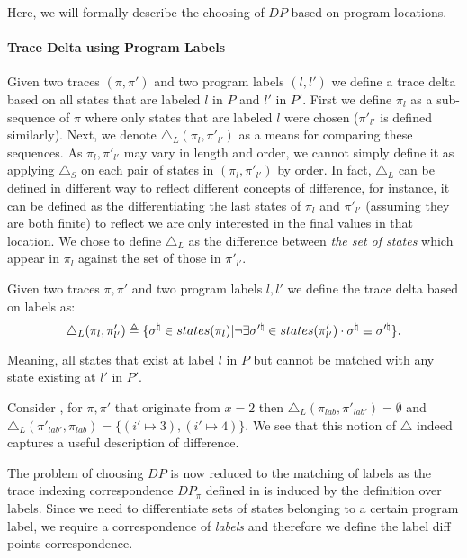 Here, we will formally describe the choosing of $DP$ based on program locations.

\paragraph{Trace Delta using Program Labels} 
Given two traces $(\pi,\pi')$ and two program labels $(l,l')$ we define a trace delta based on all states that are labeled $l$ in $P$ and $l'$ in $P'$. First we define $\pi_{l}$ as a sub-sequence of $\pi$ where only states that are labeled $l$ were chosen ($\pi'_{l'}$ is defined similarly). Next, we denote $\triangle_L(\pi_{l},\pi'_{l'})$ as a means for comparing these sequences. As $\pi_{l},\pi'_{l'}$ may vary in length and order, we cannot simply define it as applying $\triangle_{S}$ on each pair of states in $(\pi_{l},\pi'_{l'})$ by order. In fact, $\triangle_{L}$ can be defined in different way to reflect different concepts of difference, for instance, it can be defined as the differentiating the last states of $\pi_{l}$ and $\pi'_{l'}$ (assuming they are both finite) to reflect we are only interested in the final values in that location. We chose to define $\triangle_{L}$ as the difference between \emph{the set of states} which appear in $\pi_{l}$ against the set of those in $\pi'_{l'}$.
\begin{definition}
Given two traces $\pi,\pi'$ and two program labels $l,l'$ we define the trace delta based on labels as:
\[
\triangle_{L}(\pi_{l},\pi'_{l'}) \triangleq \{ \sigma^\natural \in states(\pi_{l}) | \neg \exists \sigma'^\natural \in states(\pi'_{l'}) \cdot \sigma^\natural \equiv \sigma'^\natural \}.
\]
\end{definition}
Meaning, all states that exist at label $l$ in $P$ but cannot be matched with any state existing at $l'$ in $P'$.

\begin{Example}
Consider , for $\pi, \pi'$ that originate from $x=2$  then $\triangle_{L}(\pi_{lab},\pi'_{lab'}) = \emptyset$ and $\triangle_{L}(\pi'_{lab'},\pi_{lab}) = \{ (i' \mapsto 3),(i' \mapsto 4) \}$. We see that this notion of $\triangle$ indeed captures a useful description of difference.
\end{Example}

The problem of choosing $DP$ is now reduced to the matching of labels as the trace indexing correspondence $DP_{\pi}$ defined in  is induced by the definition over labels. Since we need to differentiate sets of states belonging to a certain program label, we require a correspondence of \emph{labels} and therefore we define the label diff points correspondence.

